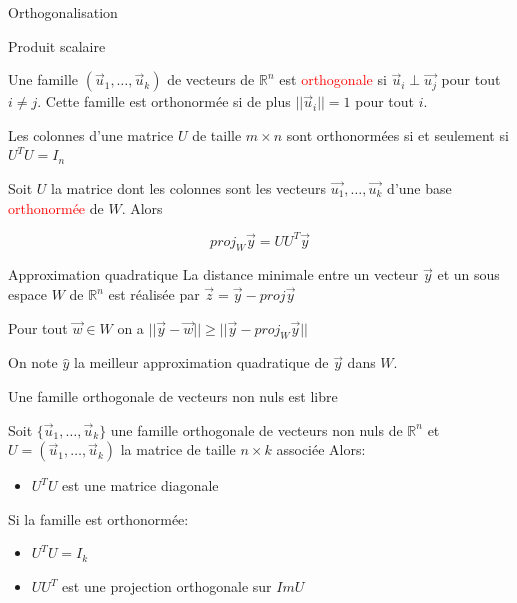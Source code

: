 \begin{parag}{Orthogonalisation}
\begin{subparag}{Produit scalaire}
    \end{subparag}
    \begin{definition}
     Une famille $(\vec{u}_1, \dots, \vec{u}_k)$ de vecteurs de $\mathbb{R}^n$ est \textcolor{red}{orthogonale} si $\vec{u}_i \perp \vec{u_j}$ pour tout $i \neq j$. Cette famille est orthonormée si de plus $||\vec{u}_i|| = 1$ pour tout $i$.
    \end{definition}
    \begin{theoreme}
        Les colonnes d'une matrice $U$ de taille $m \times n$ sont orthonormées si et seulement si $U^TU = I_n$
    \end{theoreme}
    \begin{theoreme}
        Soit $U$ la matrice dont les colonnes sont les vecteurs $\vec{u_1}, \dots, \vec{u_k}$ d'une base \textcolor{red}{orthonormée} de $W$. Alors
        \begin{formule}
            \[proj_W\vec{y} = UU^T\vec{y}\]
        \end{formule}
    \end{theoreme}
    \begin{subparag}{Approximation quadratique}
        La distance minimale entre un vecteur $\vec{y}$ et un sous espace $W$ de $\mathbb{R}^n$ est réalisée par $\vec{z} = \vec{y} - proj\vec{y}$
        \begin{theoreme}
            Pour tout $\vec{w}\in W$ on a $||\vec{y} - \vec{w}|| \geq || \vec{y} - proj_W\vec{y}||$
        \end{theoreme}
        On note $\hat{y}$ la meilleur approximation quadratique de $\vec{y}$ dans $W$.
    \end{subparag}
    \begin{truc}
        Une famille orthogonale de vecteurs non nuls est libre
    \end{truc}
    \begin{truc}
        Soit $\{\vec{u}_1, \dots, \vec{u}_k\}$ une famille orthogonale de vecteurs non nuls de $\mathbb{R}^n$ et $U = (\vec{u}_1, \dots,\vec{u}_k)$ la matrice de taille $n\times k$ associée Alors:
        \begin{itemize}
            \item $U^TU$ est une matrice diagonale
        \end{itemize}
        Si la famille est orthonormée:
        \begin{itemize}
            \item $U^TU= I_k$
            \item $UU^T$ est une projection orthogonale sur $ImU$

\end{itemize}
\end{truc}
\end{parag}

